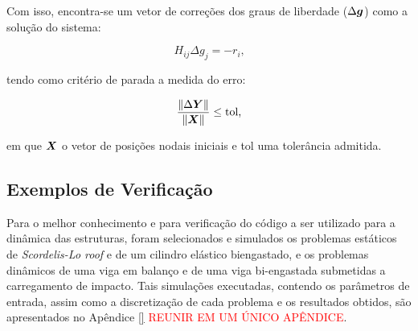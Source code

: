 Com isso, encontra-se um vetor de correções dos graus de liberdade ($\Delta\boldsymbol{g}$) como a solução do sistema:

\begin{equation}
    H_{ij}\Delta g_j=-r_i\text{,}
\end{equation}

\noindent tendo como critério de parada a medida do erro:

\begin{equation}
    \frac{\left\lVert{\Delta\boldsymbol{Y}}\right\lVert}{\left\lVert{\boldsymbol{X}}\right\lVert}\leq\text{tol,}
    \label{eq:CSD-erro}
\end{equation}

\noindent em que $\boldsymbol{X}$ o vetor de posições nodais iniciais e tol uma tolerância admitida.

%
%

\subsection{Exemplos de Verificação} \label{MEFP-Ex}

Para o melhor conhecimento e para verificação do código a ser utilizado para a dinâmica das estruturas, foram selecionados e simulados os problemas estáticos de \textit{Scordelis-Lo roof} e de um cilindro elástico biengastado, e os problemas dinâmicos de uma viga em balanço e de uma viga bi-engastada submetidas a carregamento de impacto. Tais simulações executadas, contendo os parâmetros de entrada, assim como a discretização de cada problema e os resultados obtidos, são apresentados no Apêndice \ref{} \textcolor{red}{REUNIR EM UM ÚNICO APÊNDICE}. %